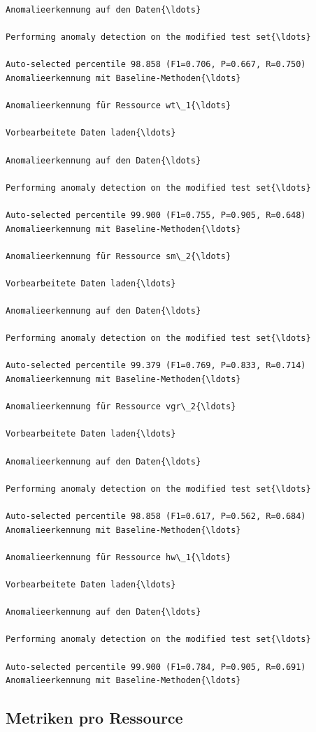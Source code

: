 \documentclass[11pt]{article}
\begin{document}
\begin{Verbatim}[commandchars=\\\{\}]
Anomalieerkennung auf den Daten{\ldots}

Performing anomaly detection on the modified test set{\ldots}

Auto-selected percentile 98.858 (F1=0.706, P=0.667, R=0.750)
Anomalieerkennung mit Baseline-Methoden{\ldots}

Anomalieerkennung für Ressource wt\_1{\ldots}

Vorbearbeitete Daten laden{\ldots}

Anomalieerkennung auf den Daten{\ldots}

Performing anomaly detection on the modified test set{\ldots}

Auto-selected percentile 99.900 (F1=0.755, P=0.905, R=0.648)
Anomalieerkennung mit Baseline-Methoden{\ldots}

Anomalieerkennung für Ressource sm\_2{\ldots}

Vorbearbeitete Daten laden{\ldots}

Anomalieerkennung auf den Daten{\ldots}

Performing anomaly detection on the modified test set{\ldots}

Auto-selected percentile 99.379 (F1=0.769, P=0.833, R=0.714)
Anomalieerkennung mit Baseline-Methoden{\ldots}

Anomalieerkennung für Ressource vgr\_2{\ldots}

Vorbearbeitete Daten laden{\ldots}

Anomalieerkennung auf den Daten{\ldots}

Performing anomaly detection on the modified test set{\ldots}

Auto-selected percentile 98.858 (F1=0.617, P=0.562, R=0.684)
Anomalieerkennung mit Baseline-Methoden{\ldots}

Anomalieerkennung für Ressource hw\_1{\ldots}

Vorbearbeitete Daten laden{\ldots}

Anomalieerkennung auf den Daten{\ldots}

Performing anomaly detection on the modified test set{\ldots}

Auto-selected percentile 99.900 (F1=0.784, P=0.905, R=0.691)
Anomalieerkennung mit Baseline-Methoden{\ldots}

    \end{Verbatim}

    \subsection{Metriken pro Ressource}\label{metriken-pro-ressource}
\end{document}
